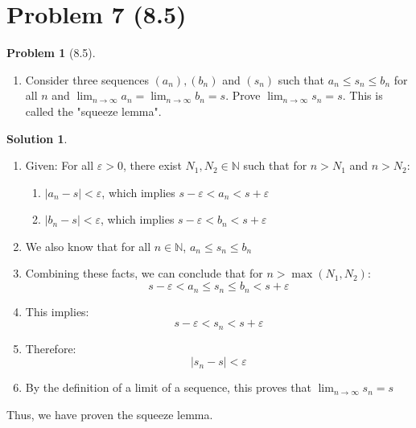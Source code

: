 \documentclass[12pt]{article}
\theoremstyle{definition} %
\newtheorem{solution}{Solution}
\newtheorem{problem}{Problem}
\theoremstyle{plain} %
\begin{document}
\section*{Problem 7 (8.5)}
\begin{problem}[8.5]
 \begin{enumerate}
    \item Consider three sequences $(a_{n}), (b_n)$ and $(s_{n})$ such that $a_{n}\leq s_{n}\leq b_{n}$ for all $n$ and $\lim_{ n \to \infty }a_{n}=\lim_{ n \to \infty }b_{n}=s$. Prove $\lim_{ n \to \infty }s_{n}=s$. This is called the "squeeze lemma".
\end{enumerate}
  
\end{problem}
\begin{solution}
     \begin{enumerate}
        \item Given: For all $\varepsilon > 0$, there exist $N_1, N_2 \in \mathbb{N}$ such that for $n > N_1$ and $n > N_2$:
        \begin{enumerate}
            \item $|a_n - s| < \varepsilon$, which implies $s - \varepsilon < a_n < s + \varepsilon$
            \item $|b_n - s| < \varepsilon$, which implies $s - \varepsilon < b_n < s + \varepsilon$
        \end{enumerate}
        \item We also know that for all $n \in \mathbb{N}$, $a_n \leq s_n \leq b_n$
        \item Combining these facts, we can conclude that for $n > \max(N_1, N_2)$:
        $$
        s - \varepsilon < a_n \leq s_n \leq b_n < s + \varepsilon
        $$
        \item This implies:
        $$
        s - \varepsilon < s_n < s + \varepsilon
        $$
        \item Therefore:
        $$
        |s_n - s| < \varepsilon
        $$
        \item By the definition of a limit of a sequence, this proves that $\lim_{n \to \infty} s_n = s$
    \end{enumerate}
    Thus, we have proven the squeeze lemma. 


\end{solution}
\end{document}
